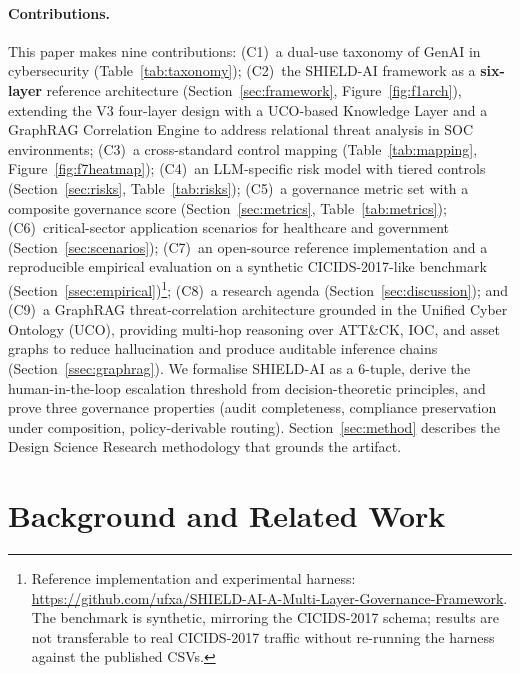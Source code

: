 \documentclass[preprint,12pt,authoryear]{elsarticle}
\begin{document}
\paragraph{Contributions.} This paper makes nine contributions:
(C1)~a dual-use taxonomy of GenAI in cybersecurity (Table~\ref{tab:taxonomy});
(C2)~the SHIELD-AI framework as a \textbf{six-layer} reference architecture
(Section~\ref{sec:framework}, Figure~\ref{fig:f1arch}),
extending the V3 four-layer design with a UCO-based Knowledge Layer and a
GraphRAG Correlation Engine to address relational threat analysis in SOC environments;
(C3)~a cross-standard control mapping (Table~\ref{tab:mapping}, Figure~\ref{fig:f7heatmap});
(C4)~an LLM-specific risk model with tiered controls (Section~\ref{sec:risks}, Table~\ref{tab:risks});
(C5)~a governance metric set with a composite governance score (Section~\ref{sec:metrics},
Table~\ref{tab:metrics});
(C6)~critical-sector application scenarios for healthcare and government (Section~\ref{sec:scenarios});
(C7)~an open-source reference implementation and a reproducible empirical evaluation on a
synthetic CICIDS-2017-like benchmark
(Section~\ref{ssec:empirical})\footnote{Reference implementation and experimental harness:
\url{https://github.com/ufxa/SHIELD-AI-A-Multi-Layer-Governance-Framework}.
The benchmark is synthetic, mirroring the CICIDS-2017 schema; results are not transferable
to real CICIDS-2017 traffic without re-running the harness against the published CSVs.};
(C8)~a research agenda (Section~\ref{sec:discussion}); and
(C9)~a GraphRAG threat-correlation architecture grounded in the Unified Cyber Ontology (UCO),
providing multi-hop reasoning over ATT\&CK, IOC, and asset graphs to reduce hallucination
and produce auditable inference chains (Section~\ref{ssec:graphrag}).
We formalise SHIELD-AI as a 6-tuple, derive the human-in-the-loop escalation threshold from
decision-theoretic principles, and prove three governance properties (audit completeness,
compliance preservation under composition, policy-derivable routing).
Section~\ref{sec:method} describes the Design Science Research methodology that grounds the artifact.

\section{Background and Related Work}
\label{sec:background}
\end{document}
